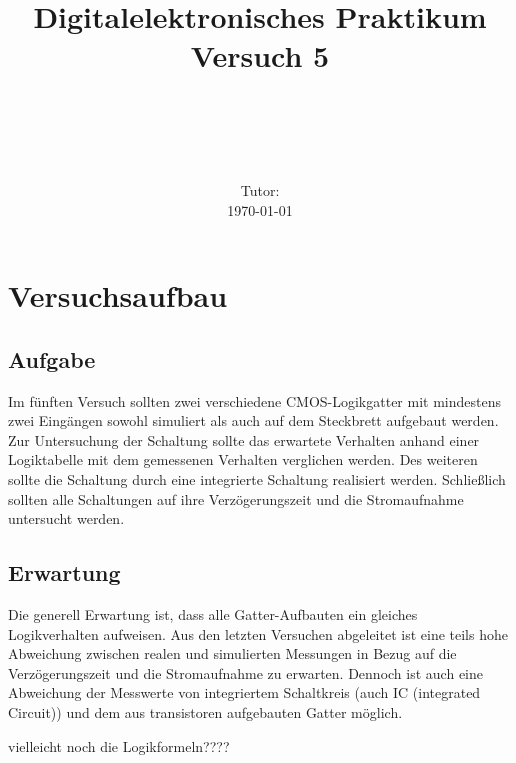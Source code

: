 \documentclass[11pt, a4paper]{article}
\title{\textbf{Digitalelektronisches Praktikum\\ Versuch 5}}
\author{\ATutantName \\ \emph{\ATutantEmail} \and \BTutantName\\ \emph{\BTutantEmail}}
\date{\Gruppennummer \\[3ex] Tutor: \Tutorname \\[3ex] \today}
\begin{document}
\clearpage
\maketitle
\thispagestyle{empty}
\newpage


\section*{Versuchsaufbau}
\subsection*{Aufgabe}
Im fünften Versuch sollten zwei verschiedene CMOS-Logikgatter mit mindestens zwei Eingängen sowohl simuliert als auch auf dem Steckbrett aufgebaut werden. Zur Untersuchung der Schaltung sollte das erwartete Verhalten anhand einer Logiktabelle mit dem gemessenen Verhalten verglichen werden. Des weiteren sollte die Schaltung durch eine integrierte Schaltung realisiert werden. Schließlich sollten alle Schaltungen auf ihre Verzögerungszeit und die Stromaufnahme untersucht werden.
\subsection*{Erwartung}
Die generell Erwartung ist, dass alle Gatter-Aufbauten ein gleiches Logikverhalten aufweisen. Aus den letzten Versuchen abgeleitet ist eine teils hohe Abweichung zwischen realen und simulierten Messungen in Bezug auf die Verzögerungszeit und die Stromaufnahme zu erwarten. Dennoch ist auch eine Abweichung der Messwerte von integriertem Schaltkreis (auch IC (integrated Circuit)) und dem aus transistoren aufgebauten Gatter möglich.


vielleicht noch die Logikformeln????
\end{document}
